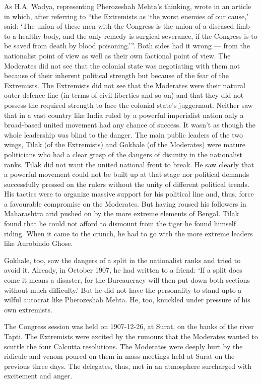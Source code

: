 As H.A. Wadya, representing Pherozeshah Mehta's thinking, wrote in an article in which, after referring to ``the Extremists as `the worst enemies of our cause,' said: `The union of these men with the Congress is the union of a diseased limb to a healthy body, and the only remedy is surgical severance, if the Congress is to be saved from death by blood poisoning.'''. Both sides had it wrong --- from the nationalist point of view as well as their own factional point of view. The Moderates did not see that the colonial state was negotiating with them not because of their inherent political strength but because of the fear of the Extremists. The Extremists did not see that the Moderates were their natural outer defence line (in terms of civil liberties and so on) and that they did not possess the required strength to face the colonial state's juggernaut. Neither saw that in a vast country like India ruled by a powerful imperialist nation only a broad-based united movement had any chance of success. It wasn't as though the whole leadership was blind to the danger. The main public leaders of the two wings, Tilak (of the Extremists) and Gokhale (of the Moderates) were mature politicians who had a clear grasp of the dangers of disunity in the nationalist ranks. Tilak did not want the united national front to break. He saw clearly that a powerful movement could not be built up at that stage nor political demands successfully pressed on the rulers without the unity of different political trends. His tactics were to organize massive support for his political line and, thus, force a favourable compromise on the Moderates. But having roused his followers in Maharashtra arid pushed on by the more extreme elements of Bengal. Tilak found that he could not afford to dismount from the tiger he found himself riding. When it came to the crunch, he had to go with the more extreme leaders like Aurobindo Ghose.

Gokhale, too, saw the dangers of a split in the nationalist ranks and tried to avoid it. Already, in October 1907, he had written to a friend: `If a split does come it means a disaster, for the Bureaucracy will then put down both sections without much difficulty.' But he did not have the personality to stand upto a wilful autocrat like Pherozeshah Mehta. He, too, knuckled under pressure of his own extremists.

The Congress session was held on 1907-12-26, at Surat, on the banks of the river Tapti. The Extremists were excited by the rumours that the Moderates wanted to scuttle the four Calcutta resolutions. The Moderates were deeply hurt by the ridicule and venom poured on them in mass meetings held at Surat on the previous three days. The delegates, thus, met in an atmosphere surcharged with excitement and anger.

